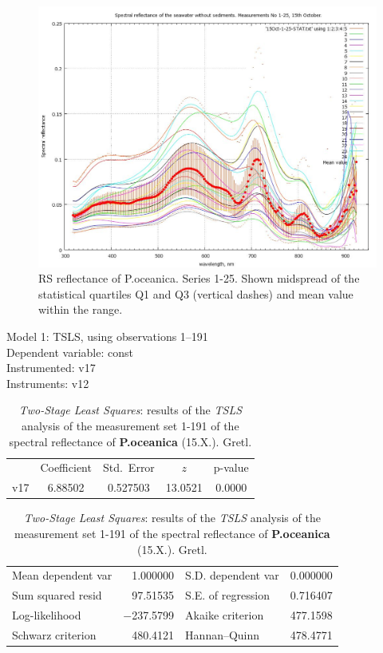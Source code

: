 \documentclass[10pt, a4paper]{article}
\begin{document}
\begin{appendices}
\begin{figure}[H]
\begin{center}
\includegraphics[scale=0.25]{GNU-12.jpg}
\caption{RS reflectance of P.oceanica. Series 1-25. Shown midspread of the statistical quartiles Q1 and Q3 (vertical dashes) and
mean value within the range.­}
\label{fig:55}
\end{center}
\end{figure}

\begin{table}[htbp]
\caption{\textit{Two-Stage Least Squares}: results of the \textit{TSLS} analysis of the measurement set 1-191 of the spectral reflectance of \textbf{P.oceanica} (15.X.). Gretl.}
\begin{center}
Model 1: TSLS, using observations 1--191\\
Dependent variable: const\\
Instrumented: v17 \\
Instruments: v12 \\

\vspace{1em}

\begin{tabular}{|c c c c c|}
  &  {Coefficient} &  {Std.\ Error} &  {$z$} &    {p-value} \\[1ex]
v17 &  6.88502 & 0.527503 & 13.0521 & 0.0000 \\
\end{tabular}

\vspace{1ex}
\begin{tabular}{lrlr}
Mean dependent var &  1.000000 & S.D. dependent var &  0.000000 \\
Sum squared resid &  97.51535 & S.E. of regression &  0.716407 \\
Log-likelihood & $-$237.5799 & Akaike criterion &  477.1598 \\
Schwarz criterion &  480.4121 & Hannan--Quinn &  478.4771 \\
\end{tabular}


\end{center}
\end{table}
\end{appendices}
\end{document}
